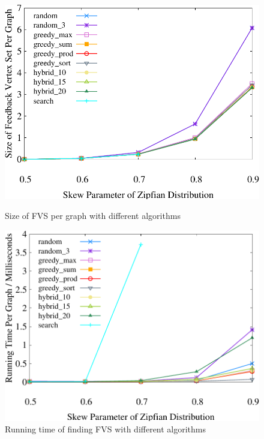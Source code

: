 \begin{figure}[t]
    \centering
    \begin{minipage}[b]{0.31\linewidth}
        \centering
        \includegraphics[width=\textwidth]{./exp_fig/fvs/fvs}
        \vspace{-2em}
        \caption{Size of FVS per graph with different algorithms}
        \label{fig:fvs:fvs}
    \end{minipage}
    \begin{minipage}[b]{0.31\linewidth}
        \centering
        \includegraphics[width=\textwidth]{./exp_fig/fvs/latency}
        \vspace{-2em}
        \caption{Running time of finding FVS with different algorithms}

\end{minipage}
\end{figure}
